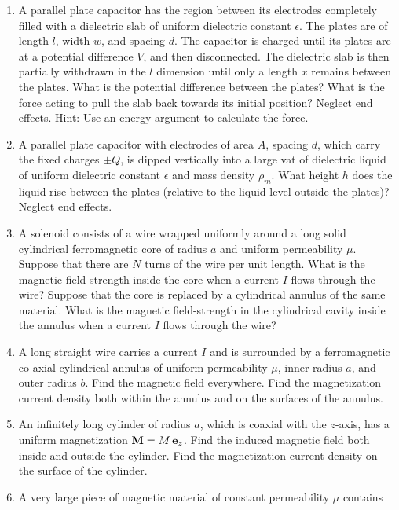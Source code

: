 {\begin{enumerate}
\begin{enumerate}
filled by a solid dielectric of uniform dielectric constant $\epsilon$, which does not touch the plates, and the capacitor is then charged to a voltage $V$.
\end{enumerate}
\item A parallel plate capacitor has the region between its electrodes
completely filled with a dielectric slab of uniform dielectric constant $\epsilon$. The plates
are of length $l$, width $w$, and spacing $d$. The capacitor is
charged until its plates are at a potential difference $V$, and then disconnected. The dielectric slab is then partially withdrawn in the
$l$ dimension until only a length $x$ remains between the plates.
What is the potential difference between the plates? What is the
force acting to pull the slab back towards its initial position? Neglect
end effects. Hint: Use an energy argument to calculate the force.
\item A parallel plate capacitor with electrodes of area $A$, spacing
$d$, which carry the fixed charges $\pm Q$, is dipped vertically into a large vat of dielectric liquid of uniform dielectric
constant $\epsilon$ and 
mass density $\rho_m$. What height $h$ does the liquid rise between
the plates (relative to the liquid level outside the plates)? Neglect end effects.
\item A solenoid consists of a wire wrapped uniformly around a long solid cylindrical ferromagnetic core
of radius $a$ and uniform permeability $\mu$. Suppose that there are $N$
turns of the wire per unit length. What is the magnetic field-strength inside
the core when a current $I$ flows through the wire? Suppose that the core
is replaced by a cylindrical annulus of the same material. What is
the magnetic field-strength in the cylindrical cavity inside the annulus when a current $I$ flows
through the wire?
\item A long straight wire carries a current $I$ and is surrounded by
a ferromagnetic co-axial cylindrical annulus of uniform permeability $\mu$, inner radius $a$, and
outer radius $b$. Find the magnetic field everywhere. Find the magnetization
current density both within the annulus and on the surfaces of the annulus.
\item An infinitely long  cylinder of radius $a$, which is coaxial with the $z$-axis, has a uniform magnetization ${\bf M} = M\,{\bf e}_z$. Find the induced magnetic
field both inside and outside the cylinder. Find the magnetization current
density on the surface of the cylinder.
\item A very large piece of magnetic material  of constant permeability  $\mu$ contains

\end{enumerate}}
